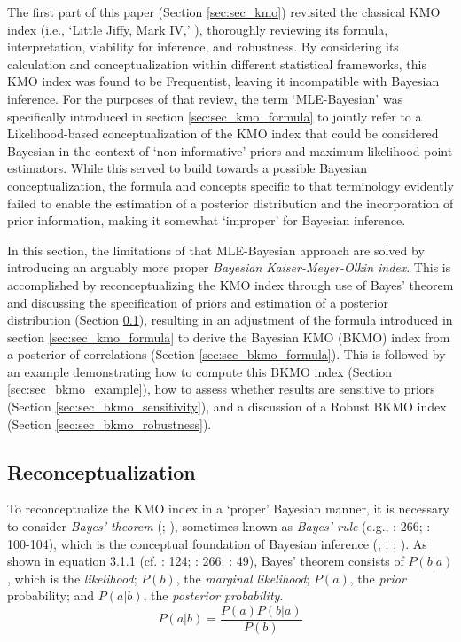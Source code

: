 \documentclass[
  10pt,
  a4paper,
  twoside]{article}
\begin{document}
The first part of this paper (Section \ref{sec:sec_kmo}) revisited the classical KMO index (i.e., `Little Jiffy, Mark IV,' ), thoroughly reviewing its formula, interpretation, viability for inference, and robustness. By considering its calculation and conceptualization within different statistical frameworks, this KMO index was found to be Frequentist, leaving it incompatible with Bayesian inference. For the purposes of that review, the term `MLE-Bayesian' was specifically introduced in section \ref{sec:sec_kmo_formula} to jointly refer to a Likelihood-based conceptualization of the KMO index that could be considered Bayesian in the context of `non-informative' priors and maximum-likelihood point estimators. While this served to build towards a possible Bayesian conceptualization, the formula and concepts specific to that terminology evidently failed to enable the estimation of a posterior distribution and the incorporation of prior information, making it somewhat `improper' for Bayesian inference.

In this section, the limitations of that MLE-Bayesian approach are solved by introducing an arguably more proper \emph{Bayesian Kaiser-Meyer-Olkin index}. This is accomplished by reconceptualizing the KMO index through use of Bayes' theorem and discussing the specification of priors and estimation of a posterior distribution (Section \ref{sec:sec_bkmo_conceptualization}), resulting in an adjustment of the formula introduced in section \ref{sec:sec_kmo_formula} to derive the Bayesian KMO (BKMO) index from a posterior of correlations (Section \ref{sec:sec_bkmo_formula}). This is followed by an example demonstrating how to compute this BKMO index (Section \ref{sec:sec_bkmo_example}), how to assess whether results are sensitive to priors (Section \ref{sec:sec_bkmo_sensitivity}), and a discussion of a Robust BKMO index (Section \ref{sec:sec_bkmo_robustness}).

\subsection{Reconceptualization}\label{sec:sec_bkmo_conceptualization}

To reconceptualize the KMO index in a `proper' Bayesian manner, it is necessary to consider \emph{Bayes' theorem} (; ), sometimes known as \emph{Bayes' rule} (e.g., : 266; : 100-104), which is the conceptual foundation of Bayesian inference (; ; ; ). As shown in equation 3.1.1 (cf. : 124; : 266; : 49), Bayes' theorem consists of \(P(b | a)\), which is the \emph{likelihood}; \(P(b)\), the \emph{marginal likelihood}; \(P(a)\), the \emph{prior} probability; and \(P(a | b)\), the \emph{posterior probability}.
\[
P(a | b) = \frac{P(a)P(b | a)}{P(b)}
\tag{3.1.1}
\]
\end{document}
